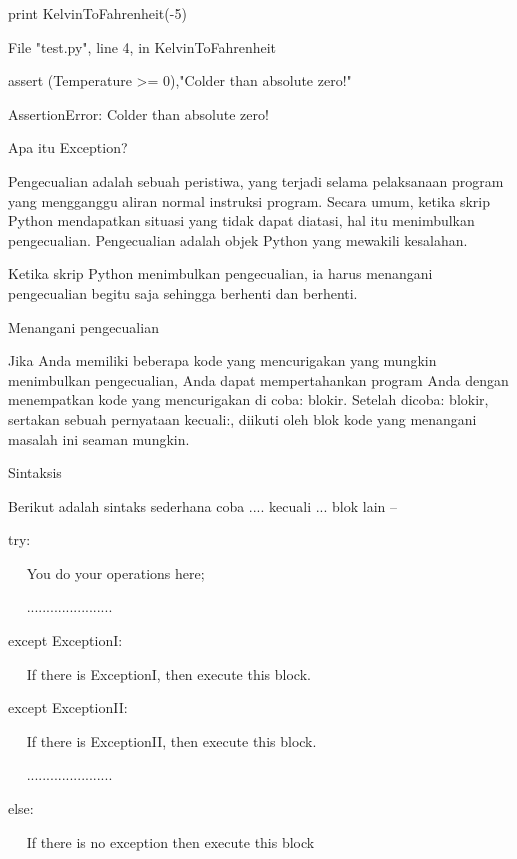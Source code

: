 print KelvinToFahrenheit(-5) \par
File "test.py", line 4, in KelvinToFahrenheit \par
assert (Temperature >= 0),"Colder than absolute zero!" \par
AssertionError: Colder than absolute zero! \par
\vspace{12pt}
\vspace{12pt}
Apa itu Exception? \par
\vspace{12pt}
Pengecualian adalah sebuah peristiwa, yang terjadi selama pelaksanaan program yang mengganggu aliran normal instruksi program. Secara umum, ketika skrip Python mendapatkan situasi yang tidak dapat diatasi, hal itu menimbulkan pengecualian. Pengecualian adalah objek Python yang mewakili kesalahan. \par
\vspace{12pt}
Ketika skrip Python menimbulkan pengecualian, ia harus menangani pengecualian begitu saja sehingga berhenti dan berhenti. \par
Menangani pengecualian \par
\vspace{12pt}
Jika Anda memiliki beberapa kode yang mencurigakan yang mungkin menimbulkan pengecualian, Anda dapat mempertahankan program Anda dengan menempatkan kode yang mencurigakan di coba: blokir. Setelah dicoba: blokir, sertakan sebuah pernyataan kecuali:, diikuti oleh blok kode yang menangani masalah ini seaman mungkin. \par
Sintaksis \par
\vspace{12pt}
Berikut adalah sintaks sederhana coba .... kecuali ... blok lain – \par
\vspace{12pt}
try: \par
~~ You do your operations here; \par
~~ ...................... \par
except ExceptionI: \par
~~ If there is ExceptionI, then execute this block. \par
except ExceptionII: \par
~~ If there is ExceptionII, then execute this block. \par
~~ ...................... \par
else: \par
~~ If there is no exception then execute this block \par
